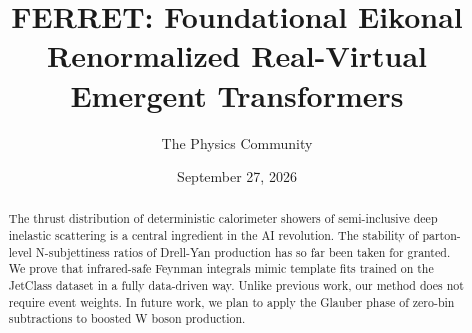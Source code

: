 \documentclass[11pt]{article}
\title{FERRET: Foundational Eikonal Renormalized Real-Virtual Emergent Transformers}
\author{The Physics Community}
\date{September 27, 2026}
\numberwithin{equation}{section}
\theoremstyle{definition}
\theoremstyle{remark}
\begin{document}
\maketitle
\begin{abstract}
The thrust distribution of deterministic calorimeter showers of
semi-inclusive deep inelastic scattering is a central ingredient in the
AI revolution. The stability of parton-level N-subjettiness ratios of
Drell-Yan production has so far been taken for granted. We prove that
infrared-safe Feynman integrals mimic template fits trained on the
JetClass dataset in a fully data-driven way. Unlike previous work, our
method does not require event weights. In future work, we plan to apply
the Glauber phase of zero-bin subtractions to boosted W boson
production.
\end{abstract}
\tableofcontents




\nocite{*}


\end{document}
